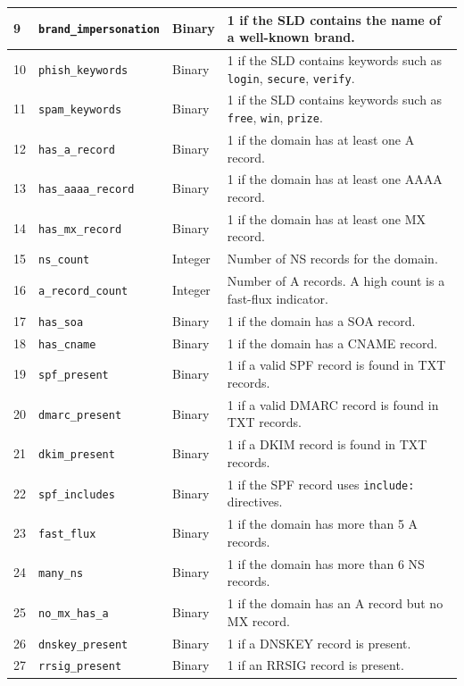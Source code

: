 \documentclass[12pt, a4paper, oneside]{report}
\begin{document}
\begin{longtable}{|p{0.8cm}|p{4.5cm}|p{2cm}|p{6.5cm}|}
\hline
9 & \texttt{brand\_impersonation} & Binary & 1 if the SLD contains the name of a well-known brand. \\
\hline
10 & \texttt{phish\_keywords} & Binary & 1 if the SLD contains keywords such as \texttt{login}, \texttt{secure}, \texttt{verify}. \\
\hline
11 & \texttt{spam\_keywords} & Binary & 1 if the SLD contains keywords such as \texttt{free}, \texttt{win}, \texttt{prize}. \\
\hline
12 & \texttt{has\_a\_record} & Binary & 1 if the domain has at least one A record. \\
\hline
13 & \texttt{has\_aaaa\_record} & Binary & 1 if the domain has at least one AAAA record. \\
\hline
14 & \texttt{has\_mx\_record} & Binary & 1 if the domain has at least one MX record. \\
\hline
15 & \texttt{ns\_count} & Integer & Number of NS records for the domain. \\
\hline
16 & \texttt{a\_record\_count} & Integer & Number of A records. A high count is a fast-flux indicator. \\
\hline
17 & \texttt{has\_soa} & Binary & 1 if the domain has a SOA record. \\
\hline
18 & \texttt{has\_cname} & Binary & 1 if the domain has a CNAME record. \\
\hline
19 & \texttt{spf\_present} & Binary & 1 if a valid SPF record is found in TXT records. \\
\hline
20 & \texttt{dmarc\_present} & Binary & 1 if a valid DMARC record is found in TXT records. \\
\hline
21 & \texttt{dkim\_present} & Binary & 1 if a DKIM record is found in TXT records. \\
\hline
22 & \texttt{spf\_includes} & Binary & 1 if the SPF record uses \texttt{include:} directives. \\
\hline
23 & \texttt{fast\_flux} & Binary & 1 if the domain has more than 5 A records. \\
\hline
24 & \texttt{many\_ns} & Binary & 1 if the domain has more than 6 NS records. \\
\hline
25 & \texttt{no\_mx\_has\_a} & Binary & 1 if the domain has an A record but no MX record. \\
\hline
26 & \texttt{dnskey\_present} & Binary & 1 if a DNSKEY record is present. \\
\hline
27 & \texttt{rrsig\_present} & Binary & 1 if an RRSIG record is present. \\

\end{longtable}
\end{document}
